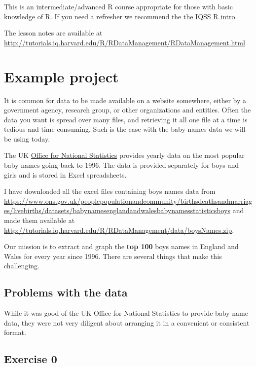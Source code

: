 \documentclass[]{book}
\begin{document}
This is an intermediate/advanced R course appropriate for those with
basic knowledge of R. If you need a refresher we recommend the
\href{http://tutorials.iq.harvard.edu/R/Rintro/Rintro.html}{the IQSS R
intro}.

The lesson notes are available at
\url{http://tutorials.iq.harvard.edu/R/RDataManagement/RDataManagement.html}

\section{Example project}\label{example-project}

It is common for data to be made available on a website somewhere,
either by a government agency, research group, or other organizations
and entities. Often the data you want is spread over many files, and
retrieving it all one file at a time is tedious and time consuming. Such
is the case with the baby names data we will be using today.

The UK \href{https://www.ons.gov.uk}{Office for National Statistics}
provides yearly data on the most popular baby names going back to 1996.
The data is provided separately for boys and girls and is stored in
Excel spreadsheets.

I have downloaded all the excel files containing boys names data from
\url{https://www.ons.gov.uk/peoplepopulationandcommunity/birthsdeathsandmarriages/livebirths/datasets/babynamesenglandandwalesbabynamesstatisticsboys}
and made them available at
\url{http://tutorials.iq.harvard.edu/R/RDataManagement/data/boysNames.zip}.

Our mission is to extract and graph the \textbf{top 100} boys names in
England and Wales for every year since 1996. There are several things
that make this challenging.

\subsection{Problems with the data}\label{problems-with-the-data}

While it was good of the UK Office for National Statistics to provide
baby name data, they were not very diligent about arranging it in a
convenient or consistent format.

\subsection{Exercise 0}\label{exercise-0-1}
\end{document}
